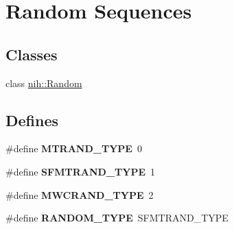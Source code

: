 \hypertarget{group__random}{
\section{\-Random \-Sequences}
\label{group__random}
}
\subsection*{\-Classes}
\begin{DoxyCompactItemize}
\item 
class \hyperlink{classnih_1_1_random}{nih\-::\-Random}
\end{DoxyCompactItemize}
\subsection*{\-Defines}
\begin{DoxyCompactItemize}
\item 
\hypertarget{group__random_ga0602a8d929019640555bc6f299536346}{
\#define {\bfseries \-M\-T\-R\-A\-N\-D\-\_\-\-T\-Y\-P\-E}~0}
\label{group__random_ga0602a8d929019640555bc6f299536346}

\item 
\hypertarget{group__random_gaba19be52cf7d6a5f72d16f67d09a356a}{
\#define {\bfseries \-S\-F\-M\-T\-R\-A\-N\-D\-\_\-\-T\-Y\-P\-E}~1}
\label{group__random_gaba19be52cf7d6a5f72d16f67d09a356a}

\item 
\hypertarget{group__random_ga7b5ef73a43bc588bf9f9a163c3bd891e}{
\#define {\bfseries \-M\-W\-C\-R\-A\-N\-D\-\_\-\-T\-Y\-P\-E}~2}
\label{group__random_ga7b5ef73a43bc588bf9f9a163c3bd891e}

\item 
\hypertarget{group__random_ga925679f23db78f6e2bc1b23186586d1e}{
\#define {\bfseries \-R\-A\-N\-D\-O\-M\-\_\-\-T\-Y\-P\-E}~\-S\-F\-M\-T\-R\-A\-N\-D\-\_\-\-T\-Y\-P\-E}
\label{group__random_ga925679f23db78f6e2bc1b23186586d1e}

\end{DoxyCompactItemize}

